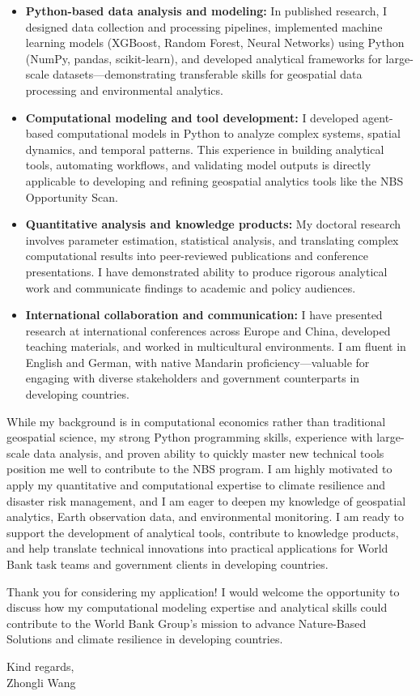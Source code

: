 \documentclass[11pt]{article}
\begin{document}
\begin{itemize}
    \item \textbf{Python-based data analysis and modeling:} In published research, I designed data collection and processing pipelines, implemented machine learning models (XGBoost, Random Forest, Neural Networks) using Python (NumPy, pandas, scikit-learn), and developed analytical frameworks for large-scale datasets—demonstrating transferable skills for geospatial data processing and environmental analytics.
    \item \textbf{Computational modeling and tool development:} I developed agent-based computational models in Python to analyze complex systems, spatial dynamics, and temporal patterns. This experience in building analytical tools, automating workflows, and validating model outputs is directly applicable to developing and refining geospatial analytics tools like the NBS Opportunity Scan.
    \item \textbf{Quantitative analysis and knowledge products:} My doctoral research involves parameter estimation, statistical analysis, and translating complex computational results into peer-reviewed publications and conference presentations. I have demonstrated ability to produce rigorous analytical work and communicate findings to academic and policy audiences.
    \item \textbf{International collaboration and communication:} I have presented research at international conferences across Europe and China, developed teaching materials, and worked in multicultural environments. I am fluent in English and German, with native Mandarin proficiency—valuable for engaging with diverse stakeholders and government counterparts in developing countries.
\end{itemize}

While my background is in computational economics rather than traditional geospatial science, my strong Python programming skills, experience with large-scale data analysis, and proven ability to quickly master new technical tools position me well to contribute to the NBS program. 
I am highly motivated to apply my quantitative and computational expertise to climate resilience and disaster risk management, and I am eager to deepen my knowledge of geospatial analytics, Earth observation data, and environmental monitoring. 
I am ready to support the development of analytical tools, contribute to knowledge products, and help translate technical innovations into practical applications for World Bank task teams and government clients in developing countries.

Thank you for considering my application! 
I would welcome the opportunity to discuss how my computational modeling expertise and analytical skills could contribute to the World Bank Group's mission to advance Nature-Based Solutions and climate resilience in developing countries.

\vspace{0.08cm}
\noindent Kind regards, \\
\noindent Zhongli Wang

\end{document}
